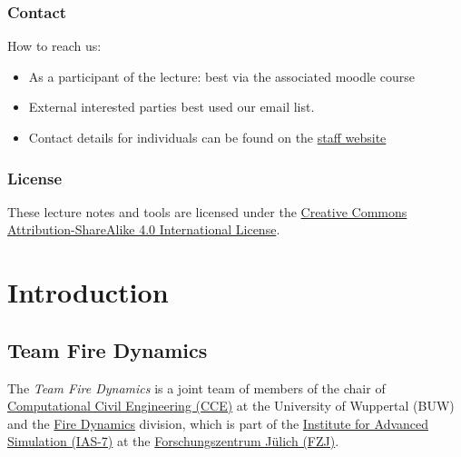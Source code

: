 \documentclass[
  letterpaper,
  DIV=11,
  numbers=noendperiod]{scrreprt}
\providecommand{\tightlist}{%
  \setlength{\itemsep}{0pt}\setlength{\parskip}{0pt}}\usepackage{longtable,booktabs,array}
\begin{document}
\section*{Contact}\label{contact}


How to reach us:

\begin{itemize}
\tightlist
\item
  As a participant of the lecture: best via the associated moodle course
\item
  External interested parties best used our email list.
\item
  Contact details for individuals can be found on the
  \href{https://cce.uni-wuppertal.de/en/team/}{staff website}
\end{itemize}

\section*{License}\label{license}


These lecture notes and tools are licensed under the
\href{http://creativecommons.org/licenses/by-sa/4.0/}{Creative Commons
Attribution-ShareAlike 4.0 International License}.

\part{Introduction}

\chapter*{Team Fire Dynamics}\label{team-fire-dynamics}


The \emph{Team Fire Dynamics} is a joint team of members of the chair of
\href{https://cce.uni-wuppertal.de/en.html}{Computational Civil
Engineering (CCE)} at the University of Wuppertal (BUW) and the
\href{https://www.fz-juelich.de/ias/ias-7/EN/Research/Fire_Dynamics/_node.html}{Fire
Dynamics} division, which is part of the
\href{https://www.fz-juelich.de/ias/ias-7}{Institute for Advanced
Simulation (IAS-7)} at the
\href{https://www.fz-juelich.de}{Forschungszentrum Jülich (FZJ)}.
\end{document}
